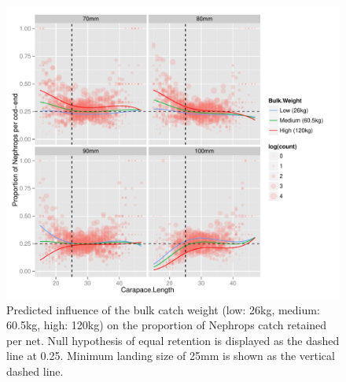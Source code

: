 \documentclass[12pt]{article}\usepackage[]{graphicx}\usepackage[]{color}
\makeatletter
\def\maxwidth{ %
  \ifdim\Gin@nat@width>\linewidth
    \linewidth
  \else
    \Gin@nat@width
  \fi
}
\newenvironment{knitrout}{}{} %
\makeatother
\begin{document}
\begin{knitrout}
\begin{figure}
\includegraphics[width=\maxwidth]{figure/unnamed-chunk-10-1} \caption[Predicted influence of the bulk catch weight (low]{Predicted influence of the bulk catch weight (low: 26kg, medium: 60.5kg, high: 120kg) on the proportion of Nephrops catch retained per net. Null hypothesis of equal retention is displayed as the dashed line at 0.25. Minimum landing size of 25mm is shown as the vertical dashed line.}\label{fig:unnamed-chunk-10}
\end{figure}


\end{knitrout}



\end{document}
